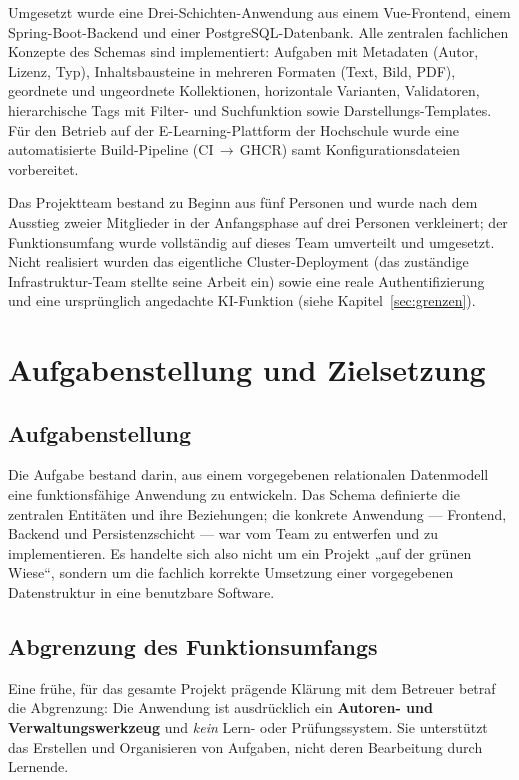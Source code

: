 \documentclass[11pt,a4paper]{article}
\begin{document}
Umgesetzt wurde eine Drei-Schichten-Anwendung aus einem Vue-Frontend, einem
Spring-Boot-Backend und einer PostgreSQL-Datenbank. Alle zentralen fachlichen
Konzepte des Schemas sind implementiert: Aufgaben mit Metadaten (Autor, Lizenz,
Typ), Inhaltsbausteine in mehreren Formaten (Text, Bild, PDF), geordnete und
ungeordnete Kollektionen, horizontale Varianten, Validatoren, hierarchische Tags
mit Filter- und Suchfunktion sowie Darstellungs-Templates. Für den Betrieb auf
der E-Learning-Plattform der Hochschule wurde eine automatisierte Build-Pipeline
(CI\,$\rightarrow$\,GHCR) samt Konfigurationsdateien vorbereitet.

Das Projektteam bestand zu Beginn aus fünf Personen und wurde nach dem Ausstieg
zweier Mitglieder in der Anfangsphase auf drei Personen verkleinert; der
Funktionsumfang wurde vollständig auf dieses Team umverteilt und umgesetzt. Nicht
realisiert wurden das eigentliche Cluster-Deployment (das zuständige
Infrastruktur-Team stellte seine Arbeit ein) sowie eine reale Authentifizierung
und eine ursprünglich angedachte KI-Funktion (siehe Kapitel~\ref{sec:grenzen}).

\section{Aufgabenstellung und Zielsetzung}

\subsection{Aufgabenstellung}
Die Aufgabe bestand darin, aus einem vorgegebenen relationalen Datenmodell eine
funktionsfähige Anwendung zu entwickeln. Das Schema definierte die zentralen
Entitäten und ihre Beziehungen; die konkrete Anwendung --- Frontend, Backend und
Persistenzschicht --- war vom Team zu entwerfen und zu implementieren. Es
handelte sich also nicht um ein Projekt „auf der grünen Wiese``, sondern um die
fachlich korrekte Umsetzung einer vorgegebenen Datenstruktur in eine benutzbare
Software.

\subsection{Abgrenzung des Funktionsumfangs}
Eine frühe, für das gesamte Projekt prägende Klärung mit dem Betreuer betraf die
Abgrenzung: Die Anwendung ist ausdrücklich ein \textbf{Autoren- und
Verwaltungswerkzeug} und \emph{kein} Lern- oder Prüfungssystem. Sie unterstützt
das Erstellen und Organisieren von Aufgaben, nicht deren Bearbeitung durch
Lernende.
\end{document}
